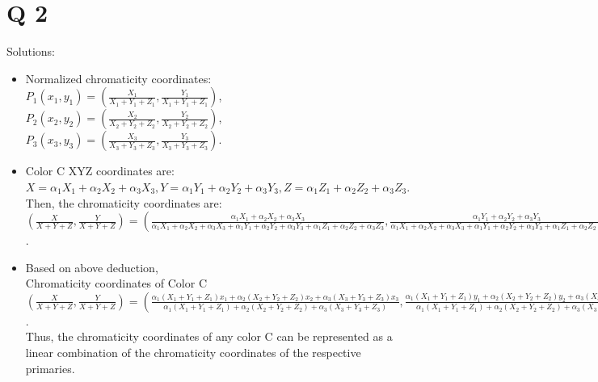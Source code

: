 \documentclass[10pt]{report}            %
\begin{document}
 \section*{Q 2}                  %
 Solutions:
 \begin{itemize}
 	\item
 	Normalized chromaticity coordinates:\\
 	$P_1(x_1, y_1)=(\frac{X_1}{X_1+Y_1+Z_1},\frac{Y_1}{X_1+Y_1+Z_1})$,$P_2(x_2, y_2)=(\frac{X_2}{X_2+Y_2+Z_2},\frac{Y_2}{X_2+Y_2+Z_2})$,$P_3(x_3, y_3)=(\frac{X_3}{X_3+Y_3+Z_3},\frac{Y_3}{X_3+Y_3+Z_3})$.\\
 	\item
 	Color C XYZ coordinates are: $X=\alpha_1 X_1+\alpha_2 X_2+\alpha_3 X_3, Y=\alpha_1 Y_1+\alpha_2 Y_2+\alpha_3 Y_3, Z=\alpha_1 Z_1+\alpha_2 Z_2+\alpha_3 Z_3$.\\
 	Then, the chromaticity coordinates are: $(\frac{X}{X+Y+Z},\frac{Y}{X+Y+Z})=(\frac{\alpha_1 X_1+\alpha_2 X_2+\alpha_3 X_3}{\alpha_1 X_1+\alpha_2 X_2+\alpha_3 X_3+\alpha_1 Y_1+\alpha_2 Y_2+\alpha_3 Y_3+\alpha_1 Z_1+\alpha_2 Z_2+\alpha_3 Z_3},\frac{\alpha_1 Y_1+\alpha_2 Y_2+\alpha_3 Y_3}{\alpha_1 X_1+\alpha_2 X_2+\alpha_3 X_3+\alpha_1 Y_1+\alpha_2 Y_2+\alpha_3 Y_3+\alpha_1 Z_1+\alpha_2 Z_2+\alpha_3 Z_3})=(\frac{\alpha_1(X_1+Y_1+Z_1)x_1+\alpha_2(X_2+Y_2+Z_2)x_2+\alpha_3(X_3+Y_3+Z_3)x_3}{\alpha_1(X_1+Y_1+Z_1)+\alpha_2(X_2+Y_2+Z_2)+\alpha_3(X_3+Y_3+Z_3)},\frac{\alpha_1(X_1+Y_1+Z_1)y_1+\alpha_2(X_2+Y_2+Z_2)y_2+\alpha_3(X_3+Y_3+Z_3)y_3}{\alpha_1(X_1+Y_1+Z_1)+\alpha_2(X_2+Y_2+Z_2)+\alpha_3(X_3+Y_3+Z_3)})$.
 	\item
 	Based on above deduction,\\
 	Chromaticity coordinates of Color C  $(\frac{X}{X+Y+Z},\frac{Y}{X+Y+Z})=(\frac{\alpha_1(X_1+Y_1+Z_1)x_1+\alpha_2(X_2+Y_2+Z_2)x_2+\alpha_3(X_3+Y_3+Z_3)x_3}{\alpha_1(X_1+Y_1+Z_1)+\alpha_2(X_2+Y_2+Z_2)+\alpha_3(X_3+Y_3+Z_3)},\frac{\alpha_1(X_1+Y_1+Z_1)y_1+\alpha_2(X_2+Y_2+Z_2)y_2+\alpha_3(X_3+Y_3+Z_3)y_3}{\alpha_1(X_1+Y_1+Z_1)+\alpha_2(X_2+Y_2+Z_2)+\alpha_3(X_3+Y_3+Z_3)})=(\frac{\alpha_1(X_1+Y_1+Z_1)}{\alpha_1(X_1+Y_1+Z_1)+\alpha_2(X_2+Y_2+Z_2)+\alpha_3(X_3+Y_3+Z_3)}x_1+\frac{\alpha_2(X_2+Y_2+Z_2)}{\alpha_1(X_1+Y_1+Z_1)+\alpha_2(X_2+Y_2+Z_2)+\alpha_3(X_3+Y_3+Z_3)}x_2+\frac{\alpha_3(X_3+Y_3+Z_3)}{\alpha_1(X_1+Y_1+Z_1)+\alpha_2(X_2+Y_2+Z_2)+\alpha_3(X_3+Y_3+Z_3)}x_3,\frac{\alpha_1(X_1+Y_1+Z_1)}{\alpha_1(X_1+Y_1+Z_1)+\alpha_2(X_2+Y_2+Z_2)+\alpha_3(X_3+Y_3+Z_3)}y_1+\frac{\alpha_2(X_2+Y_2+Z_2)}{\alpha_1(X_1+Y_1+Z_1)+\alpha_2(X_2+Y_2+Z_2)+\alpha_3(X_3+Y_3+Z_3)}y_2+\frac{\alpha_3(X_3+Y_3+Z_3)}{\alpha_1(X_1+Y_1+Z_1)+\alpha_2(X_2+Y_2+Z_2)+\alpha_3(X_3+Y_3+Z_3)}y_3)=\frac{\alpha_1(X_1+Y_1+Z_1)}{\alpha_1(X_1+Y_1+Z_1)+\alpha_2(X_2+Y_2+Z_2)+\alpha_3(X_3+Y_3+Z_3)}(x_1,y_1)+\frac{\alpha_2(X_2+Y_2+Z_2)}{\alpha_1(X_1+Y_1+Z_1)+\alpha_2(X_2+Y_2+Z_2)+\alpha_3(X_3+Y_3+Z_3)}(x_2,y_2)+\frac{\alpha_3(X_3+Y_3+Z_3)}{\alpha_1(X_1+Y_1+Z_1)+\alpha_2(X_2+Y_2+Z_2)+\alpha_3(X_3+Y_3+Z_3)}(x_3,y_3)=\alpha_1'(x_1,y_1)+\alpha_2'(x_2,y_2)+\alpha_3'(x_3,y_3)$.\\
 	Thus, the chromaticity coordinates of any color C can be represented as a linear combination of the chromaticity coordinates of the respective primaries.
 \end{itemize}
\end{document}
